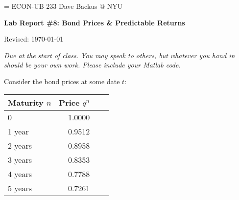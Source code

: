 \documentclass[11pt]{exam}
\begin{document}
\parskip=\bigskipamount
\parindent=0.0in
\thispagestyle{empty}
{\large ECON-UB 233 \hfill Dave Backus @ NYU}

\bigskip\bigskip
\centerline{\Large \bf Lab Report \#8:  Bond Prices \& Predictable Returns}
\centerline{Revised: \today}

\bigskip
{\it Due at the start of class.
You may speak to others, but whatever you hand in should be your own work.
Please include your Matlab code.}

\begin{questions}


Consider the bond prices at some date $t$:

\medskip
\begin{center}
\tabcolsep=0.1in
\begin{tabular}{lrrr}
\toprule
Maturity $n$   & \phantom{xx} Price $q^n$ \\ %
\midrule
0           &    1.0000   \\
1 year      &    0.9512   \\
2 years     &    0.8958   \\
3 years     &    0.8353   \\
4 years     &    0.7788   \\
5 years     &    0.7261   \\
\bottomrule
\end{tabular}
\end{center}
\medskip



\end{questions}
\end{document}
